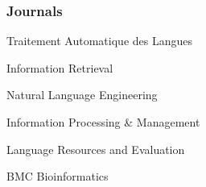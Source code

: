 \subsubsection*{Journals}

\begin{itemize*}[label={},
                 itemjoin={{,\space}},
                 afterlabel={},
                 after={{.}}]
    
    \item Traitement Automatique des Langues
    \item Information Retrieval
    \item Natural Language Engineering
    \item Information Processing \& Management
    \item Language Resources and Evaluation
    \item BMC Bioinformatics
\end{itemize*}
